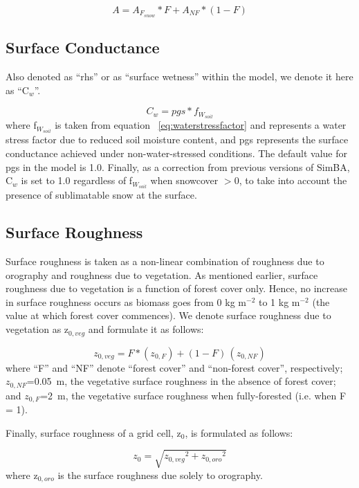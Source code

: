 \begin{equation}
A = A_{F_{snow}} * F +  A_{NF} * (1 - F)
\end{equation}

\subsection{Surface Conductance}

Also denoted as ``rhs'' or as ``surface wetness'' within the model, we denote it here as ``C$_w$''.

\begin{equation}
C_w = pgs * f_{W_{soil}} 
\end{equation}
where f$_{W_{soil}}$ is taken from equation ~\eqref{eq:waterstressfactor} and represents a water stress factor due to reduced soil moisture content, and pgs represents the surface conductance achieved under non-water-stressed conditions.  The default value for pgs in the model is 1.0.  Finally, as a correction from previous versions of SimBA, C$_w$ is set to 1.0 regardless of f$_{W_{soil}}$ when snowcover $> 0$, to take into account the presence of sublimatable snow at the surface.

\subsection{Surface Roughness}

Surface roughness is taken as a non-linear combination of roughness due to orography and roughness due to vegetation.  As mentioned earlier, surface roughness due to vegetation is a function of forest cover only.  Hence, no increase in surface roughness occurs as biomass goes from 0 kg m$^{-2}$ to 1 kg m$^{-2}$ (the value at which forest cover commences).  We denote surface roughness due to vegetation as z$_ {0,veg}$ and formulate it as follows: 

\begin{equation}
z_{0,veg} = F * (z_{0,F}) + (1 - F) \, (z_{0,NF})
\end{equation}
where ``F'' and ``NF'' denote ``forest cover'' and ``non-forest cover'', respectively; $z_{0,NF}$=0.05~m, the vegetative surface roughness in the absence of forest cover; and $z_{0,F}$=2~m, the vegetative surface roughness when fully-forested (i.e. when F = 1).

Finally, surface roughness of a grid cell, z$_0$, is formulated as follows:

\begin{equation}
z_0 = \sqrt{{z_{0,veg}}^2 + {z_{0,oro}}^2}
\end{equation}
where z$_{0,oro}$ is the surface roughness due solely to orography.

